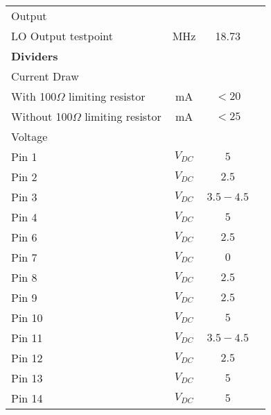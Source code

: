 \documentclass{article}[12pt]
\newcommand{\measline}{\underline{\hspace{0.75in}}}
\begin{document}
\begin{longtable}{lccc}
\multicolumn{4}{l}{\hspace{0.25in}Output} \\
\hspace{0.5in}LO Output testpoint & MHz & 18.73 & \measline \\
\hline
\multicolumn{4}{l}{\bf Dividers} \\
\multicolumn{4}{l}{\hspace{0.25in}Current Draw} \\
\hspace{0.5in}With 100$\Omega$ limiting resistor & mA & $< 20$ & \measline \\
\hspace{0.5in}Without 100$\Omega$ limiting resistor & mA & $< 25$ & \measline \\
\multicolumn{4}{l}{\hspace{0.25in}Voltage} \\
\hspace{0.5in}Pin 1 & $V_{DC}$ & $5$ & \measline \\
\hspace{0.5in}Pin 2 & $V_{DC}$ & $2.5$ & \measline \\
\hspace{0.5in}Pin 3 & $V_{DC}$ & $3.5-4.5$ & \measline \\
\hspace{0.5in}Pin 4 & $V_{DC}$ & $5$ & \measline \\
\hspace{0.5in}Pin 6 & $V_{DC}$ & $2.5$ & \measline \\
\hspace{0.5in}Pin 7 & $V_{DC}$ & $0$ & \measline \\
\hspace{0.5in}Pin 8 & $V_{DC}$ & $2.5$ & \measline \\
\hspace{0.5in}Pin 9 & $V_{DC}$ & $2.5$ & \measline \\
\hspace{0.5in}Pin 10 & $V_{DC}$ & $5$ & \measline \\
\hspace{0.5in}Pin 11 & $V_{DC}$ & $3.5-4.5$ & \measline \\
\hspace{0.5in}Pin 12 & $V_{DC}$ & $2.5$ & \measline \\
\hspace{0.5in}Pin 13 & $V_{DC}$ & $5$ & \measline \\
\hspace{0.5in}Pin 14 & $V_{DC}$ & $5$ & \measline \\

\end{longtable}
\end{document}
